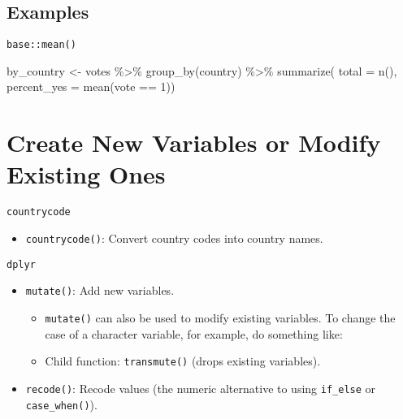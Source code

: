 \documentclass[
]{book}
\newenvironment{Shaded}{\begin{snugshade}}{\end{snugshade}}
\newcommand{\AttributeTok}[1]{\textcolor[rgb]{0.77,0.63,0.00}{#1}}
\newcommand{\DecValTok}[1]{\textcolor[rgb]{0.00,0.00,0.81}{#1}}
\newcommand{\FunctionTok}[1]{\textcolor[rgb]{0.00,0.00,0.00}{#1}}
\newcommand{\NormalTok}[1]{#1}
\newcommand{\OtherTok}[1]{\textcolor[rgb]{0.56,0.35,0.01}{#1}}
\newcommand{\SpecialCharTok}[1]{\textcolor[rgb]{0.00,0.00,0.00}{#1}}
\providecommand{\tightlist}{%
  \setlength{\itemsep}{0pt}\setlength{\parskip}{0pt}}
\begin{document}
\hypertarget{examples-3}{%
\subsection{Examples}\label{examples-3}}

\texttt{base::mean()}

\begin{Shaded}
\begin{Highlighting}[]
\NormalTok{by\_country }\OtherTok{\textless{}{-}} 
\NormalTok{  votes }\SpecialCharTok{\%\textgreater{}\%} 
  \FunctionTok{group\_by}\NormalTok{(country) }\SpecialCharTok{\%\textgreater{}\%} 
  \FunctionTok{summarize}\NormalTok{(}
    \AttributeTok{total =} \FunctionTok{n}\NormalTok{(),}
    \AttributeTok{percent\_yes =} \FunctionTok{mean}\NormalTok{(vote }\SpecialCharTok{==} \DecValTok{1}\NormalTok{))}
\end{Highlighting}
\end{Shaded}

\hypertarget{create-new-variables-or-modify-existing-ones}{%
\section{Create New Variables or Modify Existing Ones}\label{create-new-variables-or-modify-existing-ones}}

\texttt{countrycode}

\begin{itemize}
\tightlist
\item
  \texttt{countrycode()}: Convert country codes into country names.
\end{itemize}

\texttt{dplyr}

\begin{itemize}
\tightlist
\item
  \texttt{mutate()}: Add new variables.

  \begin{itemize}
  \tightlist
  \item
    \texttt{mutate()} can also be used to modify existing variables. To change the case of a character variable, for example, do something like:
  \item
    Child function: \texttt{transmute()} (drops existing variables).
  \end{itemize}
\item
  \texttt{recode()}: Recode values (the numeric alternative to using \texttt{if\_else} or \texttt{case\_when()}).
\end{itemize}
\end{document}
